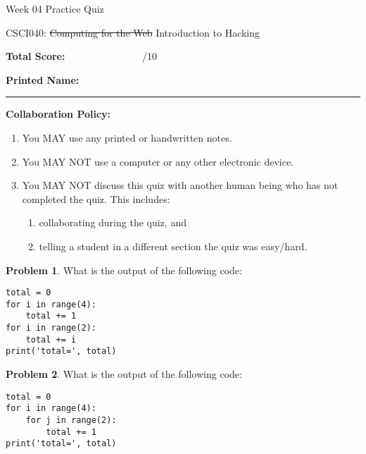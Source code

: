 \documentclass[10pt]{article}
\theoremstyle{definition}
\newtheorem{problem}{Problem}
\begin{document}
\begin{center}
    {
\Large
Week 04 Practice Quiz
}

    \vspace{0.1in}
    CSCI040: \sout{Computing for the Web} Introduction to Hacking

    \vspace{0.1in}
\end{center}


\vspace{0.15in}
\noindent
\textbf{Total Score:} ~~~~~~~~~~~~~~~/10

\vspace{0.5in}
\noindent
\textbf{Printed Name:}

\noindent
\rule{\textwidth}{0.1pt}
\vspace{0.25in}

\noindent
\textbf{Collaboration Policy:}
\begin{enumerate}
    \item You MAY use any printed or handwritten notes.
    \item You MAY NOT use a computer or any other electronic device.
    \item You MAY NOT discuss this quiz with another human being who has not completed the quiz.
        This includes:
        \begin{enumerate}
            \item collaborating during the quiz, and
            \item telling a student in a different section the quiz was easy/hard.
        \end{enumerate}
\end{enumerate}

\vspace{0.15in}

\begin{problem}
    What is the output of the following code:
\end{problem}
\begin{lstlisting}
total = 0
for i in range(4):
    total += 1
for i in range(2):
    total += i
print('total=', total)
\end{lstlisting}
\vspace{1in}

\begin{problem}
    What is the output of the following code:
\end{problem}
\begin{lstlisting}
total = 0
for i in range(4):
    for j in range(2):
        total += 1
print('total=', total)
\end{lstlisting}
\vspace{1.5in}
\end{document}
